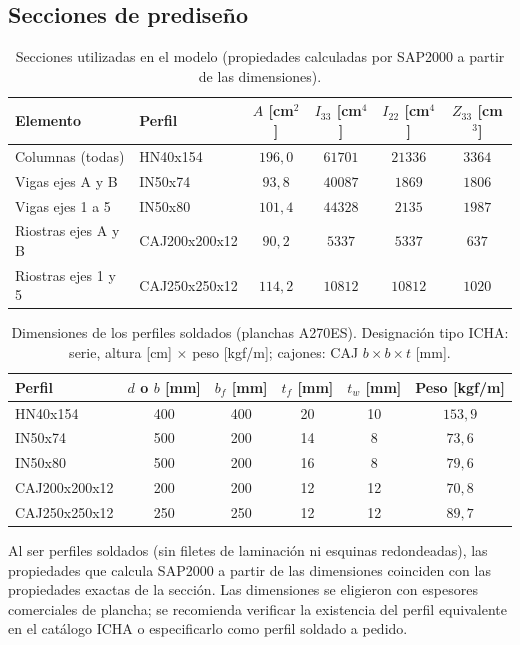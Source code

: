 \documentclass[11pt,letterpaper]{article}
\begin{document}
\subsection{Secciones de prediseño}
\begin{table}[H]
\centering
\caption{Secciones utilizadas en el modelo (propiedades calculadas por SAP2000 a partir de las dimensiones).}
\begin{tabular}{llcccc}
\toprule
Elemento & Perfil & $A$ [cm$^2$] & $I_{33}$ [cm$^4$] & $I_{22}$ [cm$^4$] & $Z_{33}$ [cm$^3$] \\
\midrule
Columnas (todas) & HN40x154 & $196{,}0$ & $61701$ & $21336$ & $3364$ \\
Vigas ejes A y B & IN50x74 & $93{,}8$ & $40087$ & $1869$ & $1806$ \\
Vigas ejes 1 a 5 & IN50x80 & $101{,}4$ & $44328$ & $2135$ & $1987$ \\
Riostras ejes A y B & CAJ200x200x12 & $90{,}2$ & $5337$ & $5337$ & $637$ \\
Riostras ejes 1 y 5 & CAJ250x250x12 & $114{,}2$ & $10812$ & $10812$ & $1020$ \\
\bottomrule
\end{tabular}
\end{table}

\begin{table}[H]
\centering
\caption{Dimensiones de los perfiles soldados (planchas A270ES). Designación tipo ICHA: serie, altura [cm] $\times$ peso [kgf/m];
cajones: CAJ $b \times b \times t$ [mm].}
\begin{tabular}{lccccc}
\toprule
Perfil & $d$ o $b$ [mm] & $b_f$ [mm] & $t_f$ [mm] & $t_w$ [mm] & Peso [kgf/m] \\
\midrule
HN40x154 & 400 & 400 & 20 & 10 & $153{,}9$ \\
IN50x74 & 500 & 200 & 14 & 8 & $73{,}6$ \\
IN50x80 & 500 & 200 & 16 & 8 & $79{,}6$ \\
CAJ200x200x12 & 200 & 200 & 12 & 12 & $70{,}8$ \\
CAJ250x250x12 & 250 & 250 & 12 & 12 & $89{,}7$ \\
\bottomrule
\end{tabular}
\end{table}
Al ser perfiles soldados (sin filetes de laminación ni esquinas redondeadas), las propiedades que calcula SAP2000
a partir de las dimensiones coinciden con las propiedades exactas de la sección. Las dimensiones se eligieron con
espesores comerciales de plancha; se recomienda verificar la existencia del perfil equivalente en el catálogo ICHA
o especificarlo como perfil soldado a pedido.
\end{document}
